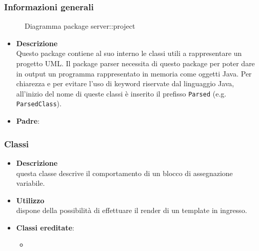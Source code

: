 \subsubsection{Informazioni generali}
\begin{figure}[H]
	\caption{Diagramma package server::project}
\end{figure}
\begin{itemize}
\item \textbf{Descrizione}\\
Questo package contiene al suo interno le classi utili a rappresentare un progetto UML. Il package parser necessita di questo package per poter dare in output un programma rappresentato in memoria come oggetti Java. Per chiarezza e per evitare l'uso di keyword riservate dal linguaggio Java, all'inizio del nome di queste classi è inserito il prefisso \texttt{Parsed} (e.g. \texttt{ParsedClass}).
\item \textbf{Padre}: \hyperref[\nogloxy{swedesigner::server}]{}
\end{itemize}
\subsubsection{Classi}
\label{\nogloxy{swedesigner::server::project::ParsedAssignment}}
\begin{itemize}
\item \textbf{Descrizione}\\
questa classe descrive il comportamento di un blocco di assegnazione variabile.	
\item \textbf{Utilizzo}\\
dispone della possibilità di effettuare il render di un template in ingresso.
\item \textbf{Classi ereditate}:
\begin{itemize}
\item \hyperref[\nogloxy{swedesigner::server::project::ParsedInstruction}]{}
\end{itemize}
\end{itemize}

